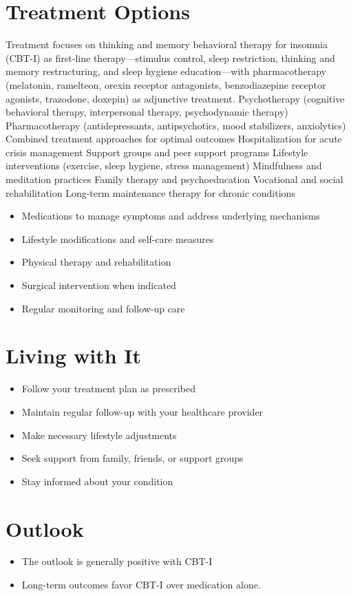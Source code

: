 \section{Treatment Options}
Treatment focuses on thinking and memory behavioral therapy for insomnia (CBT-I) as first-line therapy---stimulus control, sleep restriction, thinking and memory restructuring, and sleep hygiene education---with pharmacotherapy (melatonin, ramelteon, orexin receptor antagonists, benzodiazepine receptor agonists, trazodone, doxepin) as adjunctive treatment. Psychotherapy (cognitive behavioral therapy, interpersonal therapy, psychodynamic therapy) Pharmacotherapy (antidepressants, antipsychotics, mood stabilizers, anxiolytics) Combined treatment approaches for optimal outcomes Hospitalization for acute crisis management Support groups and peer support programs Lifestyle interventions (exercise, sleep hygiene, stress management) Mindfulness and meditation practices Family therapy and psychoeducation Vocational and social rehabilitation Long-term maintenance therapy for chronic conditions

\begin{itemize}[noitemsep]
  \item Medications to manage symptoms and address underlying mechanisms
  \item Lifestyle modifications and self-care measures
  \item Physical therapy and rehabilitation
  \item Surgical intervention when indicated
  \item Regular monitoring and follow-up care
\end{itemize}
\section{Living with It}
\begin{itemize}[noitemsep]
  \item Follow your treatment plan as prescribed
  \item Maintain regular follow-up with your healthcare provider
  \item Make necessary lifestyle adjustments
  \item Seek support from family, friends, or support groups
  \item Stay informed about your condition
\end{itemize}
\section{Outlook}
\begin{itemize}[noitemsep]
  \item The outlook is generally positive with CBT-I
  \item Long-term outcomes favor CBT-I over medication alone.
\end{itemize}
